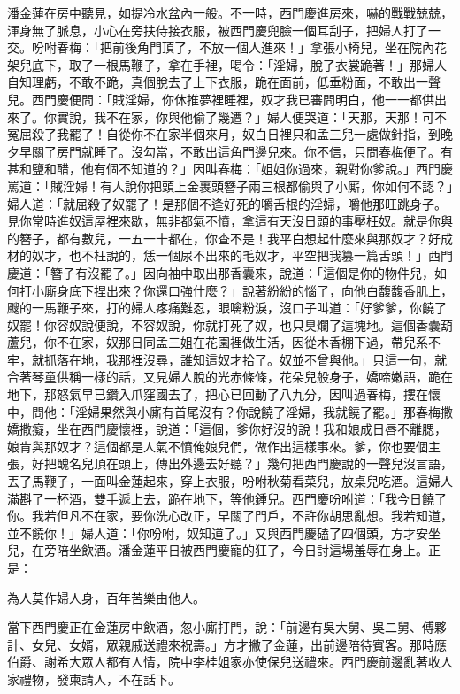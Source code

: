 潘金蓮在房中聽見，如提冷水盆內一般。不一時，西門慶進房來，嚇的戰戰兢兢，渾身無了脈息，小心在旁扶侍接衣服，被西門慶兜臉一個耳刮子，把婦人打了一交。吩咐春梅：「把前後角門頂了，不放一個人進來！」拿張小椅兒，坐在院內花架兒底下，取了一根馬鞭子，拿在手裡，喝令：「淫婦，脫了衣裳跪著！」那婦人自知理虧，不敢不跪，真個脫去了上下衣服，跪在面前，低垂粉面，不敢出一聲兒。西門慶便問：「賊淫婦，你休推夢裡睡裡，奴才我已審問明白，他一一都供出來了。你實說，我不在家，你與他偷了幾遭？」婦人便哭道：「天那，天那！可不冤屈殺了我罷了！自從你不在家半個來月，奴白日裡只和孟三兒一處做針指，到晚夕早關了房門就睡了。沒勾當，不敢出這角門邊兒來。你不信，只問春梅便了。有甚和鹽和醋，他有個不知道的？」因叫春梅：「姐姐你過來，親對你爹說。」西門慶罵道：「賊淫婦！有人說你把頭上金裹頭簪子兩三根都偷與了小廝，你如何不認？」婦人道：「就屈殺了奴罷了！是那個不逢好死的嚼舌根的淫婦，嚼他那旺跳身子。見你常時進奴這屋裡來歇，無非都氣不憤，拿這有天沒日頭的事壓枉奴。就是你與的簪子，都有數兒，一五一十都在，你查不是！我平白想起什麼來與那奴才？好成材的奴才，也不枉說的，恁一個尿不出來的毛奴才，平空把我篡一篇舌頭！」西門慶道：「簪子有沒罷了。」因向袖中取出那香囊來，說道：「這個是你的物件兒，如何打小廝身底下捏出來？你還口強什麼？」說著紛紛的惱了，向他白馥馥香肌上，颼的一馬鞭子來，打的婦人疼痛難忍，眼噙粉淚，沒口子叫道：「好爹爹，你饒了奴罷！你容奴說便說，不容奴說，你就打死了奴，也只臭爛了這塊地。這個香囊葫蘆兒，你不在家，奴那日同孟三姐在花園裡做生活，因從木香棚下過，帶兒系不牢，就抓落在地，我那裡沒尋，誰知這奴才拾了。奴並不曾與他。」只這一句，就合著琴童供稱一樣的話，又見婦人脫的光赤條條，花朵兒般身子，嬌啼嫩語，跪在地下，那怒氣早已鑽入爪窪國去了，把心已回動了八九分，因叫過春梅，摟在懷中，問他：「淫婦果然與小廝有首尾沒有？你說饒了淫婦，我就饒了罷。」那春梅撒嬌撒癡，坐在西門慶懷裡，說道：「這個，爹你好沒的說！我和娘成日唇不離腮，娘肯與那奴才？這個都是人氣不憤俺娘兒們，做作出這樣事來。爹，你也要個主張，好把醜名兒頂在頭上，傳出外邊去好聽？」幾句把西門慶說的一聲兒沒言語，丟了馬鞭子，一面叫金蓮起來，穿上衣服，吩咐秋菊看菜兒，放桌兒吃酒。這婦人滿斟了一杯酒，雙手遞上去，跪在地下，等他鍾兒。西門慶吩咐道：「我今日饒了你。我若但凡不在家，要你洗心改正，早關了門戶，不許你胡思亂想。我若知道，並不饒你！」婦人道：「你吩咐，奴知道了。」又與西門慶磕了四個頭，方才安坐兒，在旁陪坐飲酒。潘金蓮平日被西門慶寵的狂了，今日討這場羞辱在身上。正是：

為人莫作婦人身，百年苦樂由他人。

當下西門慶正在金蓮房中飲酒，忽小廝打門，說：「前邊有吳大舅、吳二舅、傅夥計、女兒、女婿，眾親戚送禮來祝壽。」方才撇了金蓮，出前邊陪待賓客。那時應伯爵、謝希大眾人都有人情，院中李桂姐家亦使保兒送禮來。西門慶前邊亂著收人家禮物，發柬請人，不在話下。

